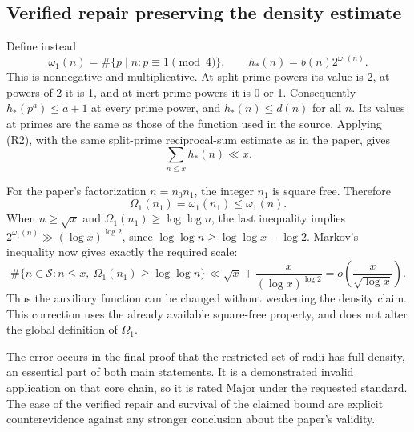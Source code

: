 \documentclass[10pt]{article}
\begin{document}
\subsection*{Verified repair preserving the density estimate}
Define instead \[\omega_1(n)=\#\{p\mid n:p\equiv1\pmod4\},\qquad
 h_*(n)=b(n)2^{\omega_1(n)}.\] This is nonnegative and multiplicative. At split prime powers its value is 2, at powers of 2 it is 1, and at inert prime powers it is 0 or 1. Consequently \(h_*(p^a)\le a+1\) at every prime power, and \(h_*(n)\le d(n)\) for all \(n\). Its values at primes are the same as those of the function used in the source. Applying (R2), with the same split-prime reciprocal-sum estimate as in the paper, gives \[\sum_{n\le x}h_*(n)\ll x.\]\par
For the paper’s factorization \(n=n_0n_1\), the integer \(n_1\) is square free. Therefore \[\Omega_1(n_1)=\omega_1(n_1)\le\omega_1(n).\] When \(n\ge\sqrt x\) and \(\Omega_1(n_1)\ge\log\log n\), the last inequality implies \(2^{\omega_1(n)}\gg(\log x)^{\log2}\), since \(\log\log n\ge\log\log x-\log2\). Markov’s inequality now gives exactly the required scale: \[\#\{n\in\mathcal S:n\le x,\ \Omega_1(n_1)\ge\log\log n\}
 \ll\sqrt x+\frac{x}{(\log x)^{\log2}}
 =o\!\left(\frac{x}{\sqrt{\log x}}\right).\] Thus the auxiliary function can be changed without weakening the density claim. This correction uses the already available square-free property, and does not alter the global definition of \(\Omega_1\).\par
The error occurs in the final proof that the restricted set of radii has full density, an essential part of both main statements. It is a demonstrated invalid application on that core chain, so it is rated Major under the requested standard. The ease of the verified repair and survival of the claimed bound are explicit counterevidence against any stronger conclusion about the paper’s validity.\par
\end{document}
